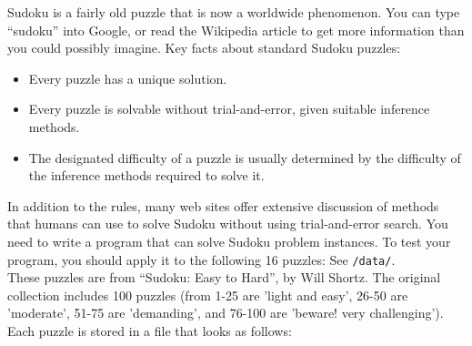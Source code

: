 \documentclass[12pt]{article}
\newenvironment{problem}[2][Problem]{\begin{trivlist}
\item[\hskip \labelsep {\bfseries #1}\hskip \labelsep {\bfseries #2.}]}{\end{trivlist}}
\begin{document}
\begin{problem}{2}
	Sudoku is a fairly old puzzle that is now a worldwide phenomenon.
	You can type ``sudoku'' into Google, or read the Wikipedia article to get more information than you could possibly imagine.
	Key facts about standard Sudoku puzzles:
	\begin{itemize}
		\item Every puzzle has a unique solution.
		\item Every puzzle is solvable without trial-and-error, given suitable inference methods.
		\item The designated difficulty of a puzzle is usually determined by the difficulty of the inference methods required to solve it.
	\end{itemize}
	In addition to the rules, many web sites offer extensive discussion of methods that humans can use to solve Sudoku without using trial-and-error search.
	You need to write a program that can solve Sudoku problem instances. To test your program, you should apply it to the following 16 puzzles:
	See \texttt{/data/}. \\
	These puzzles are from ``Sudoku: Easy to Hard'', by Will Shortz.
	The original collection includes 100 puzzles (from 1-25 are 'light and easy', 26-50 are 'moderate', 51-75 are 'demanding', and 76-100 are 'beware! very challenging').
	Each puzzle is stored in a file that looks as follows: \\


\end{problem}
\end{document}
